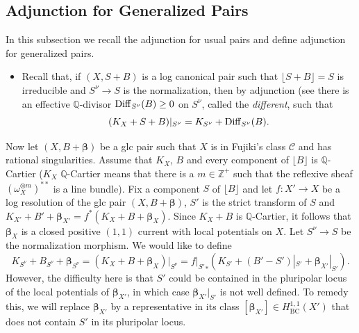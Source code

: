 \documentclass[12pt]{amsart}
\theoremstyle{plain}
\theoremstyle{remark}
\theoremstyle{definition}
\def\BC{\operatorname{BC}}
\newcommand{\<}{\leq}
\def\>{\geq}
\newcommand{\mbQ}{\mathbb{Q}}
\newcommand{\mbZ}{\mathbb{Z}}
\def\lrd{\lfloor}
\def\rrd{\rfloor}
\def\>{\geq}
\def\mcC{\mathcal{C}}
\def\lrd{\lfloor}
\def\rrd{\rfloor}
\def\bbeta{\boldsymbol{\beta}}
\theoremstyle{definition}
\theoremstyle{definition}
\numberwithin{equation}{section}
\theoremstyle{remark}
\begin{document}
\subsection{Adjunction for Generalized Pairs}\label{subsec:adjunction} In this subsection we recall the adjunction for usual pairs and define adjunction for generalized pairs.\\
\begin{itemize}
    \item Recall that, if $(X, S+B)$ is a log canonical pair such that $\lrd S+B\rrd=S$ is irreducible and $S^\nu\to S$ is the normalization, then by adjunction (see \cite[Chapter 4]{Kol13} there is an effective $\mbQ$-divisor ${\rm Diff}_{S^\nu}(B)\>0$ on $S^\nu$, called the \emph{different}, such that 
\[  
(K_X+S+B)|_{S^\nu}=K_{S^\nu}+{\rm Diff}_{S^\nu}(B).
\]
\end{itemize}
Now let $(X, B+\bbeta)$ be a glc pair such that $X$ is in Fujiki's class $\mcC$ and has rational singularities. Assume that $K_X$, $B$ and every component of $\lrd B\rrd$ is $\mbQ$-Cartier ($K_X$ $\mbQ$-Cartier means that there is a $m\in\mbZ^+$ such that the reflexive sheaf $(\omega_X^{\otimes m})^{**}$ is a line bundle). 
Fix a component $S$ of $\lrd B\rrd$ and let $f:X'\to X$ be a log resolution of the glc pair $(X, B+\bbeta)$, $S'$ is the strict transform of $S$ and $K_{X'}+B'+\bbeta_{X'}=f^*(K_X+B+\bbeta_X)$. Since $K_X+B$ is $\mbQ$-Cartier, it follows that $\bbeta_X$ is a closed positive $(1,1)$ current with local potentials on $X$. Let $S^\nu\to S$ be the normalization morphism. We would like to define \[K_{S^\nu}+B_{S^\nu}+\bbeta_{S^\nu}=(K_X+B+\bbeta_X)|_{S^\nu}={f|_{S'}}_*(K_{S'}+(B'-S')|_{S'}+\bbeta_{X'}|_{S'}).\] 
However, the difficulty here is that $S'$ could be contained in the pluripolar locus of the local potentials of $\bbeta_{X'}$, in which case $\bbeta_{X'}|_{S'}$ is not well defined. To remedy this, we will replace $\bbeta_{X'}$ by a representative in its class $[\bbeta_{X'}]\in H^{1,1}_{\BC}(X')$ that does not contain $S'$ in its pluripolar locus.
\end{document}
